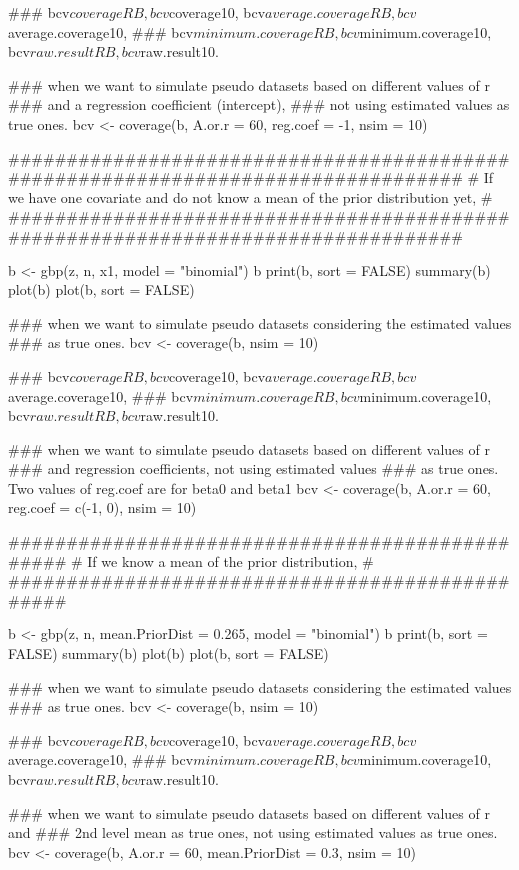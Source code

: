 \documentclass[a4paper]{book}
\begin{document}
\begin{Examples}
\begin{ExampleCode}
    ### bcv$coverageRB, bcv$coverage10, bcv$average.coverageRB, bcv$average.coverage10,
    ### bcv$minimum.coverageRB, bcv$minimum.coverage10, bcv$raw.resultRB, bcv$raw.result10.

    ### when we want to simulate pseudo datasets based on different values of r
    ### and a regression coefficient (intercept), 
    ### not using estimated values as true ones.
    bcv <- coverage(b, A.or.r = 60, reg.coef = -1, nsim = 10)  

    ##################################################################################
    # If we have one covariate and do not know a mean of the prior distribution yet, #
    ##################################################################################

    b <- gbp(z, n, x1, model = "binomial")
    b
    print(b, sort = FALSE)
    summary(b)
    plot(b)
    plot(b, sort = FALSE)

    ### when we want to simulate pseudo datasets considering the estimated values 
    ### as true ones.
    bcv <- coverage(b, nsim = 10)  

    ### bcv$coverageRB, bcv$coverage10, bcv$average.coverageRB, bcv$average.coverage10,
    ### bcv$minimum.coverageRB, bcv$minimum.coverage10, bcv$raw.resultRB, bcv$raw.result10.

    ### when we want to simulate pseudo datasets based on different values of r
    ### and regression coefficients, not using estimated values 
    ### as true ones. Two values of reg.coef are for beta0 and beta1
    bcv <- coverage(b, A.or.r = 60, reg.coef = c(-1, 0), nsim = 10)  

    ################################################
    # If we know a mean of the prior distribution, #
    ################################################

    b <- gbp(z, n, mean.PriorDist = 0.265, model = "binomial")
    b
    print(b, sort = FALSE)
    summary(b)
    plot(b)
    plot(b, sort = FALSE)

    ### when we want to simulate pseudo datasets considering the estimated values 
    ### as true ones.
    bcv <- coverage(b, nsim = 10)  

    ### bcv$coverageRB, bcv$coverage10, bcv$average.coverageRB, bcv$average.coverage10,
    ### bcv$minimum.coverageRB, bcv$minimum.coverage10, bcv$raw.resultRB, bcv$raw.result10.

    ### when we want to simulate pseudo datasets based on different values of r and
    ### 2nd level mean as true ones, not using estimated values as true ones.
    bcv <- coverage(b, A.or.r = 60, mean.PriorDist = 0.3, nsim = 10)  


\end{ExampleCode}
\end{Examples}
\end{document}
